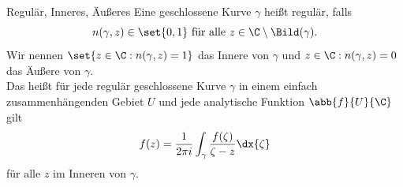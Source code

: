 \begin{karte}{Regulär, Inneres, Äußeres}
    Eine geschlossene Kurve \(\gamma\) heißt regulär, falls 
    \[ n(\gamma, z) \in \set{0,1} \text{ für alle } z\in \C\setminus \Bild(\gamma). \]
    Wir nennen \(\set{ z\in \C: n(\gamma, z) = 1 }\) das Innere von \(\gamma\) 
    und \( z\in \C : n(\gamma, z) = 0 \) das Äußere von \(\gamma\).\\
    Das heißt für jede regulär geschlossene Kurve \(\gamma\) in einem einfach 
    zusammenhängenden Gebiet \(U\) und jede analytische Funktion 
    \(\abb{f}{U}{\C}\) gilt 
    \[ f(z) = \frac{1}{2\pi i} \int_\gamma \frac{f(\zeta)}{\zeta - z} \dx{\zeta} \]
    für alle \(z\) im Inneren von \(\gamma\).
\end{karte}